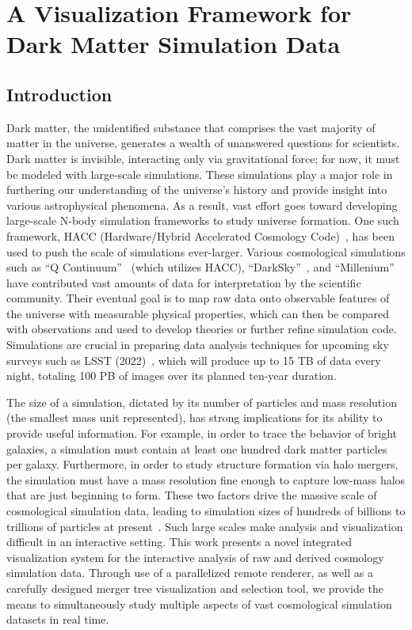 \chapter{A Visualization Framework for Dark Matter Simulation Data}

\section{Introduction}

Dark matter, the unidentified substance that comprises the vast majority of matter in the universe, generates a wealth of unanswered questions for scientists. Dark matter is invisible, interacting only via gravitational force; for now, it must be modeled with large-scale simulations. These simulations play a major role in furthering our understanding of the universe's history and provide insight into various astrophysical phenomena. As a result, vast effort goes toward developing large-scale N-body simulation frameworks to study universe formation. One such framework, HACC (Hardware/Hybrid Accelerated Cosmology Code)~\cite{Habib:2014}, has been used to push the scale of simulations ever-larger. Various cosmological simulations such as ``Q Continuum''~\cite{Heitmann:2014} (which utilizes HACC), ``DarkSky''~\cite{Skillman:2014}, and ``Millenium''~\cite{Angulo:2013} have contributed vast amounts of data for interpretation by the scientific community. Their eventual goal is to map raw data onto observable features of the universe with measurable physical properties, which can then be compared with observations and used to develop theories or further refine simulation code. Simulations are crucial in preparing data analysis techniques for upcoming sky surveys such as LSST (2022)~\cite{LSST}, which will produce up to 15 TB of data every night, totaling 100 PB of images over its planned ten-year duration.

The size of a simulation, dictated by its number of particles and mass resolution (the smallest mass unit represented), has strong implications for its ability to provide useful information. For example, in order to trace the behavior of bright galaxies, a simulation must contain at least one hundred dark matter particles per galaxy. Furthermore, in order to study structure formation via halo mergers, the simulation must have a mass resolution fine enough to capture low-mass halos that are just beginning to form. These two factors drive the massive scale of cosmological simulation data, leading to simulation sizes of hundreds of billions to trillions of particles at present~\cite{skysurvey}. Such large scales make analysis and visualization difficult in an interactive setting. This work presents a novel integrated visualization system for the interactive analysis of raw and derived cosmology simulation data. Through use of a parallelized remote renderer, as well as a carefully designed merger tree visualization and selection tool, we provide the means to simultaneously study multiple aspects of vast cosmological simulation datasets in real time.


